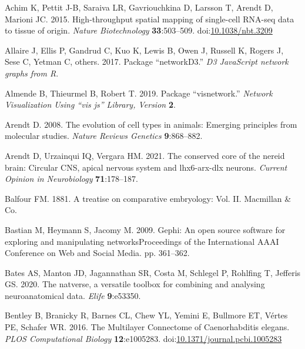 \documentclass[
  11pt,
]{article}
\newlength{\cslhangindent}
\newenvironment{CSLReferences}[2] %
 {\begin{list}{}{%
  \setlength{\itemindent}{0pt}
  \setlength{\leftmargin}{0pt}
  \setlength{\parsep}{0pt}
  \ifodd #1
   \setlength{\leftmargin}{\cslhangindent}
   \setlength{\itemindent}{-1\cslhangindent}
  \fi
  \setlength{\itemsep}{#2\baselineskip}}}
 {\end{list}}
\begin{document}
\label{refs}
\begin{CSLReferences}{1}{0}
Achim K, Pettit J-B, Saraiva LR, Gavriouchkina D, Larsson T, Arendt D,
Marioni JC. 2015. High-throughput spatial mapping of single-cell RNA-seq
data to tissue of origin. \emph{Nature Biotechnology}
\textbf{33}:503--509.
doi:\href{https://doi.org/10.1038/nbt.3209}{10.1038/nbt.3209}

Allaire J, Ellis P, Gandrud C, Kuo K, Lewis B, Owen J, Russell K, Rogers
J, Sese C, Yetman C, others. 2017. Package {``networkD3.''} \emph{D3
JavaScript network graphs from R}.

Almende B, Thieurmel B, Robert T. 2019. Package {``visnetwork.''}
\emph{Network Visualization Using {``vis js''} Library, Version}
\textbf{2}.

Arendt D. 2008. The evolution of cell types in animals: Emerging
principles from molecular studies. \emph{Nature Reviews Genetics}
\textbf{9}:868--882.

Arendt D, Urzainqui IQ, Vergara HM. 2021. The conserved core of the
nereid brain: Circular CNS, apical nervous system and lhx6-arx-dlx
neurons. \emph{Current Opinion in Neurobiology} \textbf{71}:178--187.

Balfour FM. 1881. A treatise on comparative embryology: Vol. II.
Macmillan \& Co.

Bastian M, Heymann S, Jacomy M. 2009. Gephi: An open source software for
exploring and manipulating networksProceedings of the International AAAI
Conference on Web and Social Media. pp. 361--362.

Bates AS, Manton JD, Jagannathan SR, Costa M, Schlegel P, Rohlfing T,
Jefferis GS. 2020. The natverse, a versatile toolbox for combining and
analysing neuroanatomical data. \emph{Elife} \textbf{9}:e53350.

Bentley B, Branicky R, Barnes CL, Chew YL, Yemini E, Bullmore ET, Vértes
PE, Schafer WR. 2016. The Multilayer Connectome of Caenorhabditis
elegans. \emph{PLOS Computational Biology} \textbf{12}:e1005283.
doi:\href{https://doi.org/10.1371/journal.pcbi.1005283}{10.1371/journal.pcbi.1005283}


\end{CSLReferences}
\end{document}
